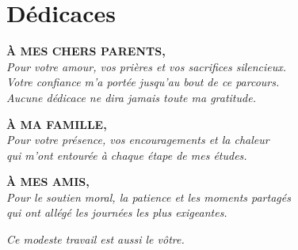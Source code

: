 \chapter*{Dédicaces}
\thispagestyle{empty}

\vspace*{2.2cm}

\begin{center}
{\large\bfseries À MES CHERS PARENTS,}\\[0.8em]
{\itshape
Pour votre amour, vos prières et vos sacrifices silencieux.\\
Votre confiance m'a portée jusqu'au bout de ce parcours.\\
Aucune dédicace ne dira jamais toute ma gratitude.}
\end{center}

\vspace{2em}

\begin{center}
{\large\bfseries À MA FAMILLE,}\\[0.8em]
{\itshape
Pour votre présence, vos encouragements et la chaleur\\
qui m'ont entourée à chaque étape de mes études.}
\end{center}

\vspace{2em}

\begin{center}
{\large\bfseries À MES AMIS,}\\[0.8em]
{\itshape
Pour le soutien moral, la patience et les moments partagés\\
qui ont allégé les journées les plus exigeantes.}
\end{center}

\vspace{2.5em}

\begin{center}
{\itshape
Ce modeste travail est aussi le vôtre.}
\end{center}

\vspace{1.5em}
\begin{flushright}
\large\textbf{\@author}
\end{flushright}
